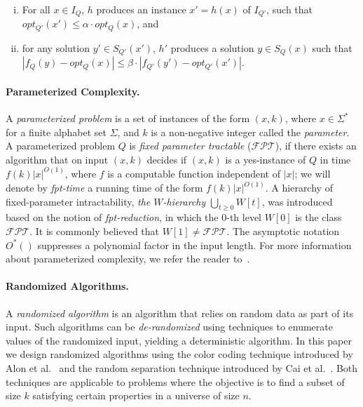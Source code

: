 \documentclass[11pt]{article}
\newcommand{\FPT}{\text{$\mathcal{FPT}$}}
\begin{document}
\begin{enumerate}[(i)]
  \item For all $x \in I_Q$, $h$ produces an instance $x' = h(x)$ of $I_{Q'}$, such that $opt_{Q'}(x') \le \alpha \cdot opt_Q(x)$, and
  \item for any solution $y' \in S_{Q'}(x')$, $h'$ produces a solution $y \in S_{Q}(x)$ such that~$|f_Q(y) - opt_Q(x)| \le \beta \cdot |f_{Q'}(y') - opt_{Q'}(x')|$.
\end{enumerate}

\paragraph{Parameterized Complexity.} A {\it parameterized problem} is a set of instances of the form $(x,
k)$, where $x \in \Sigma^*$ for a finite alphabet set $\Sigma$, and
$k$ is a non-negative integer called the {\em parameter}.
A parameterized problem $Q$ is {\it fixed parameter tractable} ($\FPT$), if there exists an algorithm that on input $(x, k)$
decides if $(x, k)$ is a yes-instance of $Q$ in time $f(k)|x|^{O(1)}$,
where $f$ is a computable function independent of $|x|$; we will denote by {\em fpt-time} a running time of the form $f(k)|x|^{O(1)}$.
A hierarchy of fixed-parameter intractability, {\it the $W$-hierarchy} $\bigcup_{t
\geq 0} W[t]$, was introduced based on the notion of {\em fpt-reduction}, in which the $0$-th level $W[0]$ is the class $\FPT$.  It is commonly believed that $W[1] \neq \FPT$. The asymptotic notation $O^*()$ suppresses a polynomial factor in the input length. For more information about parameterized complexity, we refer the reader to~\cite{fptbook,grohebook,rolfbook}.

\paragraph{Randomized Algorithms.} A {\em randomized algorithm} is an algorithm that relies on random data as part of its input.  Such algorithms can be {\em de-randomized} using techniques to enumerate values of the randomized input, yielding a deterministic algorithm.  In this paper we design randomized algorithms using the color coding technique introduced by Alon et al.~\cite{alon95} and the random separation technique introduced by Cai et al.~\cite{cai}.  Both techniques are applicable to problems where the objective is to find a subset of size $k$ satisfying certain properties in a universe of size $n$.
\end{document}
